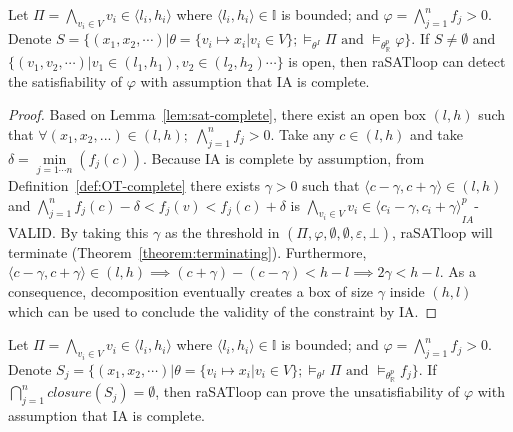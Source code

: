 \begin{theorem} \label{theorem:SAT-complete}
Let $\Pi = \bigwedge\limits_{v_i \in V} v_i \in \langle l_i, h_i \rangle$ where $\langle l_i, h_i \rangle \in \mathbb{I}$ is bounded; and ${\varphi = \bigwedge\limits_{j = 1}^n f_j > 0}$. Denote $S = \{(x_1, x_2, \cdots) | \theta = \{v_i \mapsto x_i | v_i \in V \}; \models_{\theta^I} \Pi \text{ and } \models_{\theta^p_\mathbb{R}}\varphi \}$. If $S \neq \emptyset$ and $\{(v_1, v_2, \cdots) | v_1 \in (l_1, h_1), v_2 \in (l_2, h_2) \cdots \}$ is open, then raSATloop can detect the satisfiability of $\varphi$ with assumption that IA is complete.
\end{theorem}


\begin{proof}
Based on Lemma~\ref{lem:sat-complete}, there exist an open box $(l, h)$ such that $\forall (x_1, x_2, ...) \in (l, h); \; \bigwedge\limits_{j=1}^n f_j > 0 $. Take any $c \in (l, h)$ and take $\delta = \min\limits_{j = 1\cdots n}(f_j(c))$. Because IA is complete by assumption, from Definition~\ref{def:OT-complete} there exists $\gamma > 0$ such that $\langle c - \gamma, c + \gamma \rangle \in (l, h)$ and $\bigwedge\limits_{j = 1}^n f_j(c) - \delta < f_j(v) < f_j(c) + \delta$ is ${\bigwedge\limits_{v_i \in V}v_i \in \langle c_i - \gamma, c_i + \gamma \rangle}^p_{IA}$-VALID. By taking this $\gamma$ as the threshold in $(\Pi, \varphi, \emptyset, \emptyset, \varepsilon, \bot)$, raSATloop will terminate (Theorem~\ref{theorem:terminating}). Furthermore, $\langle c - \gamma, c + \gamma \rangle \in (l, h) \implies (c + \gamma) - (c - \gamma) < h - l \implies 2\gamma < h - l$. As a consequence, decomposition eventually creates a box of size $\gamma$ inside $(h, l)$ which can be used to conclude the validity of the constraint by IA.
\end{proof}


\begin{theorem} \label{theorem:UNSAT-complete}
\sloppy
Let $\Pi = \bigwedge\limits_{v_i \in V} v_i \in \langle l_i, h_i \rangle$ where $\langle l_i, h_i \rangle \in \mathbb{I}$ is bounded; and ${\varphi = \bigwedge\limits_{j = 1}^n f_j > 0}$. Denote $S_j = \{(x_1, x_2, \cdots) | \theta = \{v_i \mapsto x_i | v_i \in V \};\models_{\theta^I} \Pi \text{ and } \models_{\theta^p_\mathbb{R}}f_j \}$. If $\bigcap\limits_{j = 1}^nclosure(S_j) = \emptyset$, then raSATloop can prove the unsatisfiability of $\varphi$ with assumption that IA is complete.
\end{theorem}


